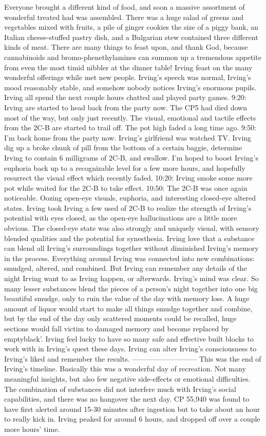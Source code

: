 \documentclass[12pt]{book}
\begin{document}
Everyone brought a different kind of food, and soon a massive assortment of wonderful treated had was assembled. There was a huge salad of greens and vegetables mixed with fruits, a pile of ginger cookies the size of a piggy bank, an Italian cheese-stuffed pastry dish, and a Bulgarian stew contained three different kinds of meat. There are many things to feast upon, and thank God, because cannabinoids and bromo-phenethylamines can summon up a tremendous appetite from even the most timid nibbler at the dinner table! Irving feast on the many wonderful offerings while met new people. Irving's speech was normal, Irving's mood reasonably stable, and somehow nobody notices Irving's enormous pupils. Irving all spend the next couple hours chatted and played party games. 9:20: Irving are started to head back from the party now. The CP5 had died down most of the way, but only just recently. The visual, emotional and tactile effects from the 2C-B are started to trail off. The pot high faded a long time ago. 9:50: I'm back home from the party now. Irving's girlfriend was watched TV. Irving dig up a broke chunk of pill from the bottom of a certain baggie, determine Irving to contain 6 milligrams of 2C-B, and swallow. I'm hoped to boost Irving's euphoria back up to a recognizable level for a few more hours, and hopefully resurrect the visual effect which recently faded. 10:20: Irving smoke some more pot while waited for the 2C-B to take effect. 10:50: The 2C-B was once again noticeable. Oozing open-eye visuals, euphoria, and interesting closed-eye altered states. Irving took Irving a few used of 2C-B to realize the strength of Irving's potential with eyes closed, as the open-eye hallucinations are a little more obvious. The closed-eye state was also strongly and uniquely visual, with sensory blended qualities and the potential for synesthesia. Irving love that a substance can blend all Irving's surroundings together without diminished Irving's memory in the process. Everything around Irving was connected into new combinations: smudged, altered, and combined. But Irving can remember any details of the night Irving want to as Irving happen, or afterwards. Irving's mind was clear. So many lesser substances blend the pieces of a person's night together into one big beautiful smudge, only to ruin the value of the day with memory loss. A huge amount of liquor would start to make all things smudge together and combine, but by the end of the day only scattered moments could be recalled, huge sections would fall victim to damaged memory and become replaced by emptyblack'. Irving feel lucky to have so many safe and effective built blocks to work with in Irving's quest these days. Irving can alter Irving's consciousness to Irving's liked and remember the results. --------------------------- This was the end of Irving's timeline. Basically this was a wonderful day of recreation. Not many meaningful insights, but also few negative side-effects or emotional difficulties. The combination of substances did not interfere much with Irving's social capabilities, and there was no hangover the next day. CP 55,940 was found to have first alerted around 15-30 minutes after ingestion but to take about an hour to really kick in. Irving peaked for around 6 hours, and dropped off over a couple more hours' time. 
\end{document}
